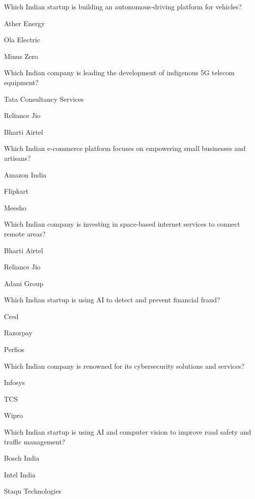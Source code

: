 \begin{enhancedmcq}{Which Indian startup is building an autonomous‑driving platform for vehicles?}
\item Ather Energy
\item Ola Electric
\item Minus Zero

\end{enhancedmcq}
\begin{enhancedmcq}{Which Indian company is leading the development of indigenous 5G telecom equipment?}
\item Tata Consultancy Services
\item Reliance Jio
\item Bharti Airtel

\end{enhancedmcq}
\begin{enhancedmcq}{Which Indian e‑commerce platform focuses on empowering small businesses and artisans?}
\item Amazon India
\item Flipkart
\item Meesho

\end{enhancedmcq}
\begin{enhancedmcq}{Which Indian company is investing in space‑based internet services to connect remote areas?}
\item Bharti Airtel
\item Reliance Jio
\item Adani Group

\end{enhancedmcq}
\begin{enhancedmcq}{Which Indian startup is using AI to detect and prevent financial fraud?}
\item Cred
\item Razorpay
\item Perfios

\end{enhancedmcq}
\begin{enhancedmcq}{Which Indian company is renowned for its cybersecurity solutions and services?}
\item Infosys
\item TCS
\item Wipro

\end{enhancedmcq}
\begin{enhancedmcq}{Which Indian startup is using AI and computer vision to improve road safety and traffic management?}
\item Bosch India
\item Intel India
\item Staqu Technologies

\end{enhancedmcq}
